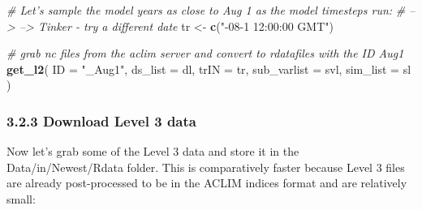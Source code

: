 \documentclass[
]{article}
\newenvironment{Shaded}{\begin{snugshade}}{\end{snugshade}}
\newcommand{\CommentTok}[1]{\textcolor[rgb]{0.56,0.35,0.01}{\textit{#1}}}
\newcommand{\DataTypeTok}[1]{\textcolor[rgb]{0.13,0.29,0.53}{#1}}
\newcommand{\KeywordTok}[1]{\textcolor[rgb]{0.13,0.29,0.53}{\textbf{#1}}}
\newcommand{\NormalTok}[1]{#1}
\newcommand{\StringTok}[1]{\textcolor[rgb]{0.31,0.60,0.02}{#1}}
\begin{document}
\begin{Shaded}
\begin{Highlighting}[]
    
    \CommentTok{# Let's sample the model years as close to Aug 1 as the model timesteps run:}
    \CommentTok{# --> --> Tinker - try a different date}
\NormalTok{    tr          <-}\StringTok{ }\KeywordTok{c}\NormalTok{(}\StringTok{"-08-1 12:00:00 GMT"}\NormalTok{) }
    
    \CommentTok{# grab nc files from the aclim server and convert to rdatafiles with the ID Aug1}
    \KeywordTok{get_l2}\NormalTok{(}
      \DataTypeTok{ID          =} \StringTok{"_Aug1"}\NormalTok{,}
      \DataTypeTok{ds_list     =}\NormalTok{ dl,}
      \DataTypeTok{trIN        =}\NormalTok{ tr,}
      \DataTypeTok{sub_varlist =}\NormalTok{ svl,  }
      \DataTypeTok{sim_list    =}\NormalTok{ sl  )}
\end{Highlighting}
\end{Shaded}

\hypertarget{download-level-3-data}{%
\subsubsection{3.2.3 Download Level 3
data}\label{download-level-3-data}}

Now let's grab some of the Level 3 data and store it in the
Data/in/Newest/Rdata folder. This is comparatively faster because Level
3 files are already post-processed to be in the ACLIM indices format and
are relatively small:
\end{document}
